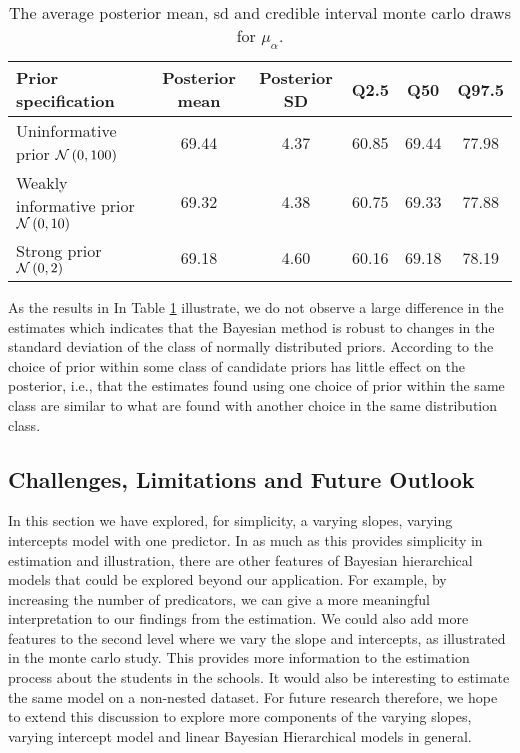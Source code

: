\begin{table}[!ht]
	\begin{center}
		\begin{tabular}{l | c c c c c}
			Prior specification & Posterior mean & Posterior SD & Q2.5 & Q50 & Q97.5\\
			\hline
			Uninformative prior $\mathcal{N}\left(0,100\right)$ & 69.44 & 4.37 & 60.85 & 69.44 & 77.98 \\
			Weakly informative prior $\mathcal{N}\left(0,10\right)$ & 69.32 &   4.38  & 60.75 &   69.33 &   77.88 \\
			Strong prior $\mathcal{N}\left(0,2\right)$ & 69.18 & 4.60 &  60.16 &  69.18  & 78.19
		\end{tabular}
	\end{center}
	\caption{The average posterior mean, sd and credible interval monte carlo draws for $\mu_{\alpha}$.}
	\label{tab:robustness}
\end{table} 
As the results in In Table \ref{tab:robustness} illustrate, we do not observe a large difference in the estimates which indicates that the Bayesian method is robust to changes in the standard deviation of the class of normally distributed priors. According to \cite{edwards1963bayesian}  the choice of prior within some class of candidate priors has little effect on the posterior, i.e., that the estimates found using one choice of prior within the same class are similar to what are found with another choice in the same distribution class.  

\subsection{Challenges, Limitations and Future Outlook}

In this section we have explored, for simplicity, a varying slopes, varying intercepts model with one predictor. In as much as this provides simplicity in estimation and illustration, there are other features of Bayesian hierarchical models that could be explored beyond our application. For example, by increasing the number of predicators, we can give a more meaningful interpretation to our findings from the estimation. We could also add more features to the second level where we vary the slope and intercepts, as illustrated in the monte carlo study. This provides more information to the estimation process about the students in the schools. It would also be interesting to estimate the same model on a non-nested dataset. For future research therefore, we hope to extend this discussion to explore more components of the varying slopes, varying intercept model and linear Bayesian Hierarchical models in general.
